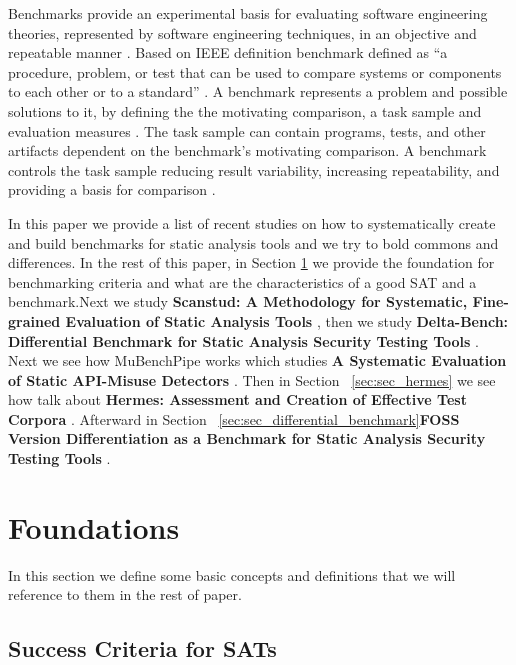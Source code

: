 \documentclass[authoryear,preprint]{sigplanconf}
\begin{document}
Benchmarks provide an experimental basis for evaluating software engineering theories, represented by software engineering techniques, in an objective and repeatable manner \cite{675631}. Based on IEEE definition benchmark defined as “a procedure, problem, or test that can be used to compare systems or components to each other or to a standard” \cite{IEEE1990}. A benchmark represents a problem and possible solutions to it, by defining the the motivating comparison, a task sample and evaluation measures \cite{sim2003}.  The task sample can contain programs, tests, and other artifacts dependent on the benchmark’s motivating comparison. A benchmark controls the task sample reducing result variability, increasing repeatability, and providing a basis for comparison \cite{sim2003}.

In this paper we provide a list of recent studies on how to systematically create and build benchmarks for static analysis tools and we try to bold commons and differences. In the rest of this paper, in Section \ref{sec:sec_approaches} we provide the foundation for benchmarking criteria and what are the characteristics of a good SAT and a benchmark.Next we study \textbf{Scanstud: A Methodology for Systematic, Fine-grained Evaluation of Static Analysis Tools} \cite{Scanstud}, then we study \textbf{Delta-Bench: Differential Benchmark for Static Analysis Security Testing Tools} \cite{8170097}. Next we see how MuBenchPipe works which studies \textbf{A Systematic Evaluation of Static API-Misuse Detectors} \cite{8338426}. Then in Section ~\ref{sec:sec_hermes} we see how talk about \textbf{Hermes: Assessment and Creation of Effective Test Corpora} \cite{Reif:2017:HAC:3088515.3088523}. Afterward in Section ~\ref{sec:sec_differential_benchmark}\textbf{FOSS Version Differentiation as a Benchmark for Static Analysis Security Testing Tools} \cite{Pashchenko:2017:FVD:3106237.3121276}.

\section{Foundations}
\label{sec:sec_approaches}

In this section we define some basic concepts and definitions that we will reference to them in the rest of paper. 

\subsection{Success Criteria for SATs}
\label{sec:subsec_successc}
\end{document}
